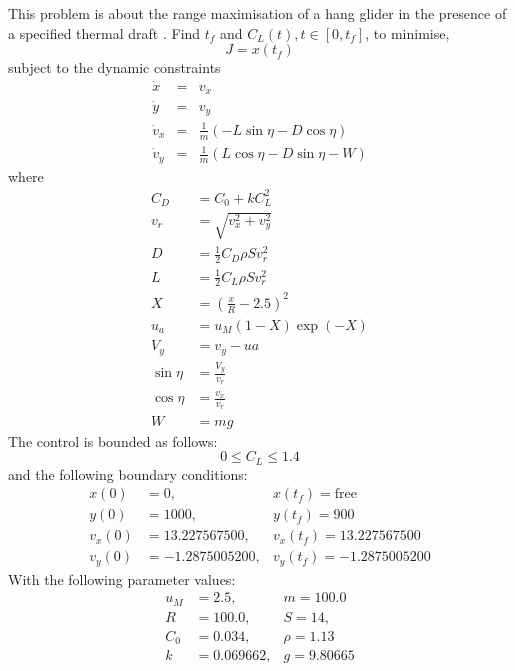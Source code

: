 \documentclass[a4paper,11pt]{report}    %
\begin{document}
This problem is about the range maximisation of a hang glider in the presence of
a specified thermal draft \cite{Betts:10}.  Find $t_f$ and $C_L(t), t \in [0, t_f]$, 
to minimise,
\begin{equation}
  J = x(t_f)
\end{equation}
subject to the dynamic constraints
\begin{equation}
  \begin{array}{lcl}
   \dot x &=& v_x \\
   \dot y &=& v_y \\
   \dot v_x &=& \frac{1}{m}(-L \sin \eta - D \cos \eta)\\
   \dot v_y &=& \frac{1}{m}( L \cos \eta - D \sin \eta - W)
  \end{array}
\end{equation}
where
\begin{equation}
 \begin{aligned}
  C_D &= C_0 + k C_L^2 \\
    v_r&= \sqrt{ v_x^2 + v_y^2 }\\
    D &= \frac{1}{2} C_D \rho S v_r^2 \\
    L &= \frac{1}{2} C_L \rho S v_r^2 \\
    X &= \left( \frac{x}{R}-2.5 \right)^2 \\
    u_a &= u_M(1-X)\exp(-X) \\
    V_y &= v_y - ua \\
    \sin \eta  &= \frac{V_y}{v_r} \\
    \cos \eta  &= \frac{v_x}{v_r} \\
    W &= mg
 \end{aligned}
\end{equation}
The control is bounded as follows:
\begin{equation}
  0 \le C_L \le 1.4
\end{equation}
and the following boundary conditions:
\begin{equation}
 \begin{aligned}
  x(0)&= 0,  &x(t_f)= \mathrm{free} \\
  y(0)&=1000, &y(t_f)= 900 \\
  v_x(0)&=13.227567500, &v_x(t_f)=13.227567500\\
  v_y(0)&=-1.2875005200, &v_y(t_f)=-1.2875005200
 \end{aligned}
\end{equation}
With the following parameter values:
\begin{equation}
 \begin{aligned}
   u_M&= 2.5,  &m=100.0 \\
   R&= 100.0, &S=14,  \\
   C_0&= 0.034, &\rho=1.13 \\  
   k&= 0.069662, &g=9.80665
 \end{aligned}
\end{equation}
\end{document}
